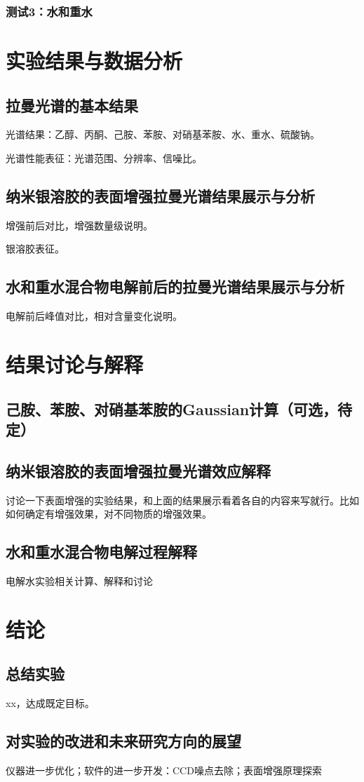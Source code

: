 \documentclass[UTF8]{article}
\begin{document}
	\subsubsection{测试3：水和重水}

	
	\section{实验结果与数据分析}
	\subsection{拉曼光谱的基本结果}
	光谱结果：乙醇、丙酮、己胺、苯胺、对硝基苯胺、水、重水、硫酸钠。

	光谱性能表征：光谱范围、分辨率、信噪比。

	\subsection{纳米银溶胶的表面增强拉曼光谱结果展示与分析}
	增强前后对比，增强数量级说明。

	银溶胶表征。

	\subsection{水和重水混合物电解前后的拉曼光谱结果展示与分析}
	电解前后峰值对比，相对含量变化说明。

	
	\section{结果讨论与解释}
	\subsection{己胺、苯胺、对硝基苯胺的Gaussian计算（可选，待定）}

	\subsection{纳米银溶胶的表面增强拉曼光谱效应解释}
	讨论一下表面增强的实验结果，和上面的结果展示看着各自的内容来写就行。比如如何确定有增强效果，对不同物质的增强效果。

	\subsection{水和重水混合物电解过程解释 }
	电解水实验相关计算、解释和讨论
	
	\section{结论}
	\subsection{总结实验}
	xx，达成既定目标。

	\subsection{对实验的改进和未来研究方向的展望}
	仪器进一步优化；软件的进一步开发：CCD噪点去除；表面增强原理探索
	
	
	
	


	
\end{document}
